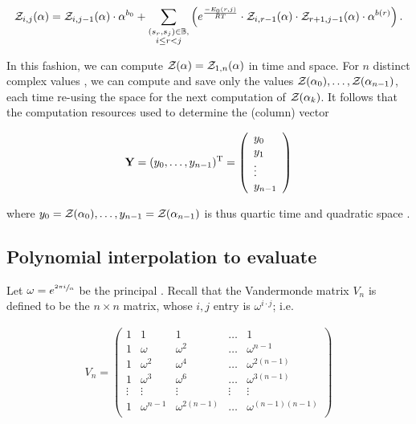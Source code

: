 \begin{align}
\label{eq:fftbor:fftborNussPolyAlpha}
\emZof{i,j}{\alpha} = \emZof{i,j-1}{\alpha} \cdot \alpha^{b_0} +
\sum_{\substack{(s_r,s_j) \in \bpSet, \\ i \le r<j}}
\left(
\boltzNuss{r,j} \cdot
\emZof{i,r-1}{\alpha} \cdot \emZof{r+1,j-1}{\alpha} \cdot \alpha^{b(r)}
\right).
\end{align}

In this fashion, we can compute ${\mathcal Z}_{}(\alpha)={\mathcal Z}_{1,n}(\alpha)$ in
 time and  space. For $n$ distinct complex values
\alphaN, we can compute and save only the
values ${\mathcal Z}_{}(\alpha_0),\dots,{\mathcal Z}_{}(\alpha_{n-1})$, each time re-using the
 space for the next computation of ${\mathcal Z}_{}(\alpha_k)$. It follows that
the computation resources used to determine the (column) vector

\begin{align}
\label{eq:fftbor:yColumn}
\bfY = (y_0,\dots,y_{n-1})^{\text T} =
\left(
\begin{array}{l}
y_0 \\
y_1 \\
\vdots \\
y_{n-1} \\
\end{array}
\right)
\end{align}

where
$y_0={\mathcal Z}_{}(\alpha_0),\dots,y_{n-1}={\mathcal Z}_{}(\alpha_{n-1})$ is thus quartic time  and quadratic space .

\subsection{Polynomial interpolation to evaluate
\texorpdfstring{}{}}
\label{subsec:fftbor:fft}

Let $\omega = e^{\sfrac{2 \pi i}{n}}$ be the principal \nRoU.
Recall that the Vandermonde matrix $V_n$ is defined to be the
$n \times n$ matrix, whose $i,j$ entry is $\omega^{i \cdot j}$; i.e.

\begin{align}
\label{eq:fftbor:vandermonde}
V_n =
\left(
\begin{array}{rrrrr}
1 & 1 & 1 & \dots & 1 \\
1 & \omega & \omega^2 & \dots & \omega^{n-1} \\
1 & \omega^2 & \omega^4 & \dots & \omega^{2(n-1)} \\
1 & \omega^3 & \omega^6 & \dots & \omega^{3(n-1)} \\
\vdots & \vdots & \vdots & \vdots & \vdots \\
1 & \omega^{n-1} & \omega^{2(n-1)} & \dots & \omega^{(n-1)(n-1)} \\
\end{array}
\right)
\end{align}

